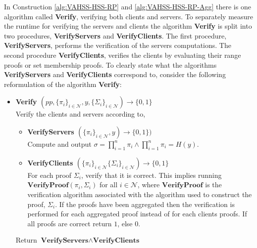 
In Construction \ref{alg:VAHSS-HSS-RP} and \ref{alg:VAHSS-HSS-RP-Agg} there is one algorithm called \textbf{Verify}, verifying both clients and servers.
To separately measure the runtime for verifying the servers and clients the  algorithm \textbf{Verify} is split into two procedures, \textbf{VerifyServers} and \textbf{VerifyClients}. The first procedure, \textbf{VerifyServers}, performs the verification of the servers computations. The second procedure  \textbf{VerifyClients}, verifies the clients by evaluating their range proofs or set membership proofs. To clearly state what the algorithms \textbf{VerifyServers} and \textbf{VerifyClients} correspond to, consider the following reformulation of the algorithm \textbf{Verify}: 
\begin{itemize}
 \item\textbf{Verify $(pp, \{\pi_i\}_{i\in\mathcal{N}},y,\{\Sigma_i\}_{i\in\mathcal{N}})\xrightarrow[]{}\{0,1\}$}\\
 Verify the clients and servers according to, 
 	\begin{itemize}
 	\item \textbf{VerifyServers $(\{\pi_i\}_{i\in\mathcal{N}},y)\xrightarrow[]{}\{0,1\})$}\\
 Compute and output $\sigma= \prod_{i=1}^n \pi_i \wedge \prod_{i=1}^n \pi_i = H(y)$.
 \item \textbf{VerifyClients $(\{\pi_i\}_{i\in\mathcal{N}}\{\Sigma_i\}_{i\in\mathcal{N}})\xrightarrow[]{}\{0,1\}$ }\\
 For each proof $\Sigma_i$, verify that it is correct. This implies running  $\textbf{VerifyProof}(\pi_i, \Sigma_i)$ for all $i\in\mathcal{N}$, where $\textbf{VerifyProof}$ is the verification algorithm associated with the algorithm used to construct the proof, $\Sigma_i$. If the proofs have been aggregated then the verification is performed for each aggregated proof instead of for each clients proofs. If all proofs are correct return $1$, else $0$.  
 \end{itemize}
Return  $\textbf{VerifyServers}\wedge \textbf{VerifyClients}$
\end{itemize}

